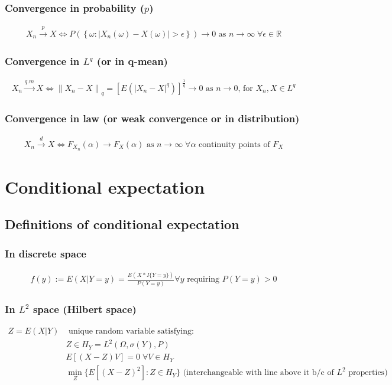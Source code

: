 \documentclass{article}
\newcommand{\norm}[2]{\left\lVert#1\right\rVert_#2}
\newcommand{\abs}[1]{\lvert#1\rvert}
\begin{document}
\subsubsection{Convergence in probability ($p$)}
\begin{align*}
  X_n \overset{p}{\longrightarrow} X \Longleftrightarrow P(\left\{\omega: \abs{X_n(\omega) - X(\omega)} > \epsilon \right\}) \longrightarrow 0 \textrm{ as } n\rightarrow \infty \; \forall \epsilon \in \mathbb{R}
\end{align*}

\subsubsection{Convergence in $L^q$ (or in q-mean)}
\begin{align*}
  X_n \overset{q.m}{\longrightarrow} X \Longleftrightarrow \norm{X_n - X}{q} = [E(\abs{X_n - X}^q)]^\frac{1}{q} \longrightarrow 0 \textrm{ as } n\rightarrow 0 \textrm{, for } X_n, X \in L^q
\end{align*}

\subsubsection{Convergence in law (or weak convergence or in distribution)}
\begin{align*}
  X_n \overset{d}{\longrightarrow} X \Longleftrightarrow F_{X_n}(\alpha) \longrightarrow F_{X}(\alpha) \textrm{ as } n \rightarrow \infty \; \forall \alpha \textrm{ continuity points of } F_X
\end{align*}

\section{Conditional expectation}
\subsection{Definitions of conditional expectation}
\subsubsection{In discrete space}
\begin{align*}
  f(y) := E(X | Y=y) = \frac{E(X * I\{Y = y\})}{P(Y = y)} \forall y \textrm{ requiring } P(Y = y) >0
\end{align*}
\subsubsection{In $L^2$ space (Hilbert space)}
\begin{align*}
  Z = E(X|Y)& \textrm{ unique random variable satisfying}:\\
  &Z \in H_Y = L^2(\Omega, \sigma(Y), P)\\
  &E[(X - Z)V] = 0\; \forall V \in H_Y\\
  &\min_Z\{E[(X - Z)^2] : Z \in H_Y\} \textrm{ (interchangeable with line above it b/c of $L^2$ properties)}
\end{align*}
\end{document}

